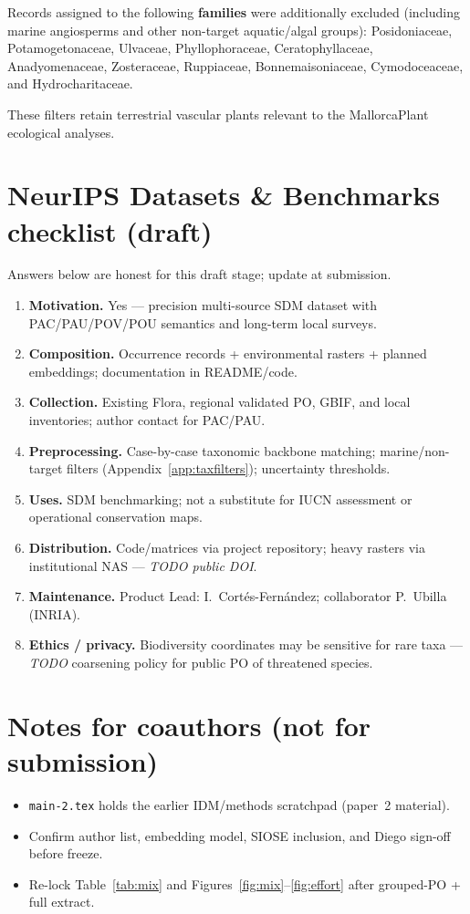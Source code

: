 \documentclass[11pt,letterpaper]{article}
\begin{document}
Records assigned to the following \textbf{families} were additionally excluded (including marine angiosperms and other non-target aquatic/algal groups):
Posidoniaceae, Potamogetonaceae, Ulvaceae, Phyllophoraceae, Ceratophyllaceae, Anadyomenaceae, Zosteraceae, Ruppiaceae, Bonnemaisoniaceae, Cymodoceaceae, and Hydrocharitaceae.

These filters retain terrestrial vascular plants relevant to the MallorcaPlant ecological analyses.


\section{NeurIPS Datasets \& Benchmarks checklist (draft)}
\label{app:checklist}

Answers below are honest for this draft stage; update at submission.

\begin{enumerate}
  \item \textbf{Motivation.} Yes --- precision multi-source SDM dataset with PAC/PAU/POV/POU semantics and long-term local surveys.
  \item \textbf{Composition.} Occurrence records + environmental rasters + planned embeddings; documentation in README/code.
  \item \textbf{Collection.} Existing Flora, regional validated PO, GBIF, and local inventories; author contact for PAC/PAU.
  \item \textbf{Preprocessing.} Case-by-case taxonomic backbone matching; marine/non-target filters (Appendix~\ref{app:taxfilters}); uncertainty thresholds.
  \item \textbf{Uses.} SDM benchmarking; not a substitute for IUCN assessment or operational conservation maps.
  \item \textbf{Distribution.} Code/matrices via project repository; heavy rasters via institutional NAS --- \emph{TODO public DOI}.
  \item \textbf{Maintenance.} Product Lead: I.~Cort\'es-Fern\'andez; collaborator P.~Ubilla (INRIA).
  \item \textbf{Ethics / privacy.} Biodiversity coordinates may be sensitive for rare taxa --- \emph{TODO} coarsening policy for public PO of threatened species.
\end{enumerate}


\section*{Notes for coauthors (not for submission)}
\begin{itemize}
  \item \texttt{main-2.tex} holds the earlier IDM/methods scratchpad (paper~2 material).
  \item Confirm author list, embedding model, SIOSE inclusion, and Diego sign-off before freeze.
  \item Re-lock Table~\ref{tab:mix} and Figures~\ref{fig:mix}--\ref{fig:effort} after grouped-PO + full extract.
\end{itemize}
\end{document}
